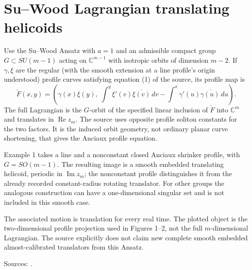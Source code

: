 \chapter{Su--Wood Lagrangian translating helicoids}\label{sec:catalogue-su-wood-translating-helicoids}
\begin{example}\label{ex:catalogue-su-wood-translating-helicoids}
Use the Su--Wood Ansatz with $a=1$ and an admissible compact group $G\subset SU(m-1)$ acting on $\mathbb C^{m-1}$ with isotropic orbits of dimension $m-2$. If $\gamma,\xi$ are the regular (with the smooth extension at a line profile's origin understood) profile curves satisfying equation (1) of the source, its profile map is
\[
 \check F(x,y)=\left(\gamma(x)\xi(y),\;
 \int^y \xi'(v)\overline{\xi(v)}\,dv-
 \int^x\gamma'(u)\overline{\gamma(u)}\,du\right).
\]
The full Lagrangian is the $G$-orbit of the specified linear inclusion of $\check F$ into $\mathbb C^m$ and translates in $\operatorname{Re}z_m$. The source uses opposite profile soliton constants for the two factors. It is the induced orbit geometry, not ordinary planar curve shortening, that gives the Anciaux profile equation.

Example 1 takes a line and a nonconstant closed Anciaux shrinker profile, with $G=SO(m-1)$. The resulting image is a smooth embedded translating helicoid, periodic in $\operatorname{Im}z_m$; the nonconstant profile distinguishes it from the already recorded constant-radius rotating translator. For other groups the analogous construction can have a one-dimensional singular set and is not included in this smooth case.

The associated motion is translation for every real time. The plotted object is the two-dimensional profile projection used in Figures 1–2, not the full $m$-dimensional Lagrangian. The source explicitly does not claim new complete smooth embedded almost-calibrated translators from this Ansatz.
\par Sources: \cite{CatSuWood2026}.
\end{example}

